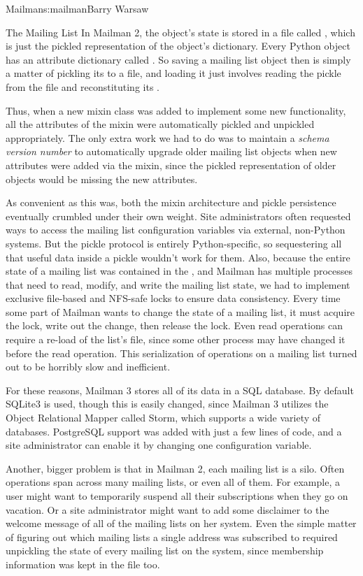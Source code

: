 \begin{aosachapter}{Mailman}{s:mailman}{Barry Warsaw}
\begin{aosasect1}{The Mailing List}
In Mailman 2, the  object's state is stored in a file
called , which is just the pickled representation of
the  object's dictionary.  Every Python object has an
attribute dictionary called .  So saving a mailing
list object then is simply a matter of pickling its
 to a file, and loading it just involves reading
the pickle from the file and reconstituting its .

Thus, when a new mixin class was added to implement some new
functionality, all the attributes of the mixin were automatically
pickled and unpickled appropriately.  The only extra work we had to do
was to maintain a \emph{schema version number} to automatically
upgrade older mailing list objects when new attributes were added via
the mixin, since the pickled representation of older 
objects would be missing the new attributes.

As convenient as this was, both the mixin architecture and pickle
persistence eventually crumbled under their own weight.  Site
administrators often requested ways to access the mailing list
configuration variables via external, non-Python systems.  But the
pickle protocol is entirely Python-specific, so sequestering all that
useful data inside a pickle wouldn't work for them.  Also, because the
entire state of a mailing list was contained in the ,
and Mailman has multiple processes that need to read, modify, and
write the mailing list state, we had to implement exclusive file-based
and NFS-safe locks to ensure data consistency.  Every time some part
of Mailman wants to change the state of a mailing list, it must
acquire the lock, write out the change, then release the lock.  Even
read operations can require a re-load of the list's 
file, since some other process may have changed it before the read
operation.  This serialization of operations on a mailing list turned
out to be horribly slow and inefficient.

For these reasons, Mailman 3 stores all of its data in a SQL database.
By default SQLite3 is used, though this is easily changed, since
Mailman 3 utilizes the Object Relational Mapper called Storm, which
supports a wide variety of databases.  PostgreSQL support was added
with just a few lines of code, and a site administrator can enable it
by changing one configuration variable.

Another, bigger problem is that in Mailman 2, each mailing list is a
silo.  Often operations span across many mailing lists, or even all of
them.  For example, a user might want to temporarily suspend all their
subscriptions when they go on vacation.  Or a site administrator might
want to add some disclaimer to the welcome message of all of the
mailing lists on her system.  Even the simple matter of figuring out
which mailing lists a single address was subscribed to required
unpickling the state of every mailing list on the system, since
membership information was kept in the  file too.


\end{aosasect1}
\end{aosachapter}
